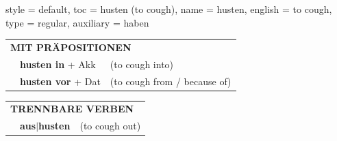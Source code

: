 \begin{verbentry}{
  style = {default},
  toc = {husten (to cough)},
  name = {husten},
  english = {to cough},
  type = {regular},
  auxiliary = {haben}
}
\vspace{10pt}

\begin{tabular}{lll}
\multicolumn{3}{l}{\textbf{MIT PRÄPOSITIONEN}}\\
& \textbf{husten in} + Akk & (to cough into)\\
& \textbf{husten vor} + Dat & (to cough from / because of)\\
\end{tabular}
\hfill
\begin{tabular}{lll}
\multicolumn{3}{l}{\textbf{TRENNBARE VERBEN}}\\
& \textbf{aus$|$husten} & (to cough out)\\
\end{tabular}
\vspace{-5pt}
\end{verbentry}
